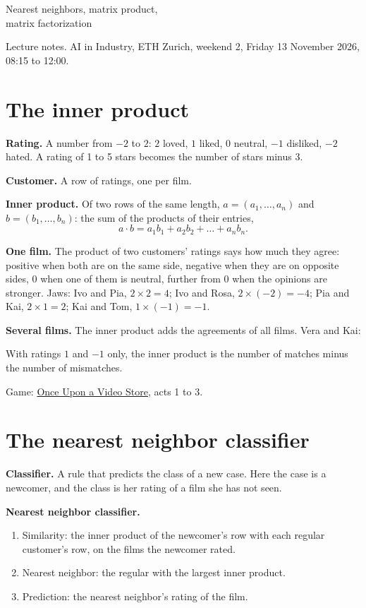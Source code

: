 \documentclass[11pt,a4paper]{article}
\newcommand{\term}[1]{\textbf{#1}}
\newcommand{\VideoStore}{\href{https://eth-ainit-hs26.github.io/AINIT-PAGE/viz/we2/video-store/}{Once Upon a Video Store}}
\begin{document}
{\LARGE\bfseries\raggedright Nearest neighbors, matrix product,\\ matrix factorization\par}
\smallskip
Lecture notes. AI in Industry, ETH Zurich, weekend 2, Friday 13 November 2026, 08:15 to 12:00.

\section{The inner product}

\term{Rating.} A number from $-2$ to $2$: $2$ loved, $1$ liked, $0$ neutral, $-1$ disliked, $-2$ hated. A rating
of 1 to 5 stars becomes the number of stars minus 3.

\term{Customer.} A row of ratings, one per film.

\term{Inner product.} Of two rows of the same length, $a = (a_1, \dots, a_n)$ and $b = (b_1, \dots, b_n)$: the sum
of the products of their entries,
\[ a \cdot b = a_1 b_1 + a_2 b_2 + \dots + a_n b_n. \]

\term{One film.} The product of two customers' ratings says how much they agree: positive when both are on the
same side, negative when they are on opposite sides, $0$ when one of them is neutral, further from $0$ when the
opinions are stronger. Jaws: Ivo and Pia, $2 \times 2 = 4$; Ivo and Rosa, $2 \times (-2) = -4$; Pia and Kai,
$2 \times 1 = 2$; Kai and Tom, $1 \times (-1) = -1$.

\term{Several films.} The inner product adds the agreements of all films. Vera and Kai:
\begin{center}

\end{center}

With ratings $1$ and $-1$ only, the inner product is the number of matches minus the number of mismatches.

Game: \VideoStore, acts 1 to 3.

\section{The nearest neighbor classifier}

\term{Classifier.} A rule that predicts the class of a new case. Here the case is a newcomer, and the class is her
rating of a film she has not seen.

\term{Nearest neighbor classifier.}
\begin{enumerate}
\item Similarity: the inner product of the newcomer's row with each regular customer's row, on the films the
  newcomer rated.
\item Nearest neighbor: the regular with the largest inner product.
\item Prediction: the nearest neighbor's rating of the film.
\end{enumerate}
\end{document}
